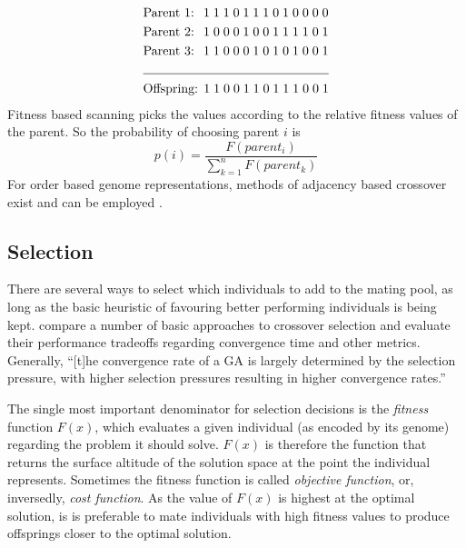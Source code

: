 \documentclass[11pt,a4paper,twoside,openright]{scrbook}
\begin{document}
\begin{equation*}
  \begin{aligned}
    & \text{Parent 1: } \;1\;1\;1\;0\;1\;1\;1\;0\;1\;0\;0\;0\;0 \\
    & \text{Parent 2: } \;1\;0\;0\;0\;1\;0\;0\;1\;1\;1\;1\;0\;1 \\
    & \text{Parent 3: } \;1\;1\;0\;0\;0\;1\;0\;1\;0\;1\;0\;0\;1 \\
    \cline{1-2}
    & \text{Offspring: 1\;1\;0\;0\;1\;1\;0\;1\;1\;1\;0\;0\;1}
  \end{aligned}
\end{equation*}
Fitness based scanning picks the values according to the relative fitness values of the parent. So the probability of choosing parent \(i\) is
\begin{equation}
p(i) = \frac{F(parent_i)}{\sum_{k=1}^{n} F(parent_k)}\label{eq:fitnessbasedscanning}
\end{equation}
For order based genome representations, methods of adjacency based crossover exist and can be employed \cite[p.3f.]{Eiben94}.

\subsection{Selection}
\label{ref:selection}
There are several ways to select which individuals to add to the mating pool, as long as the basic heuristic of favouring better performing individuals is being kept. \cite{Goldberg91} compare a number of basic approaches to crossover selection and evaluate their performance tradeoffs regarding convergence time and other metrics. Generally, ``[t]he convergence rate of a GA is largely determined by the selection pressure, with higher selection pressures resulting in higher convergence rates.'' \cite[p.\,195]{Miller95}

The single most important denominator for selection decisions is the \emph{fitness} function \(F(x)\), which evaluates a given individual (as encoded by its genome) regarding the problem it should solve. \(F(x)\) is therefore the function that returns the surface altitude of the solution space at the point the individual represents. Sometimes the fitness function is called \emph{objective function}, or, inversedly, \emph{cost function}.
As the value of \(F(x)\) is highest at the optimal solution, is is preferable to mate individuals with high fitness values to produce offsprings closer to the optimal solution.
\end{document}
